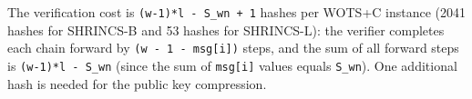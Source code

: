 The verification cost is \texttt{(w-1)*l - S\_wn + 1} hashes per WOTS+C instance (2041 hashes for SHRINCS-B and 53 hashes for SHRINCS-L): the verifier completes each chain forward by \texttt{(w - 1 - msg[i])} steps, and the sum of all forward steps is \texttt{(w-1)*l - S\_wn} (since the sum of \texttt{msg[i]} values equals \texttt{S\_wn}). One additional hash is needed for the public key compression.